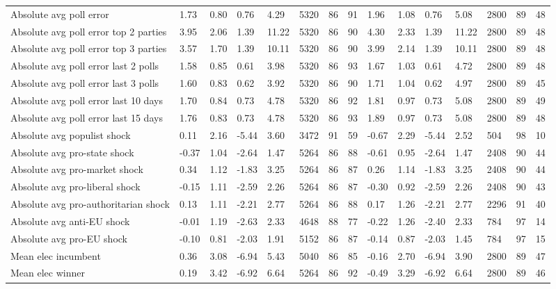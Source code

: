 \begin{longtable}{lllllllllllllll}
Absolute avg poll error & 1.73 & 0.80 & 0.76 & 4.29 & 5320 & 86 & 91 & 1.96 & 1.08 & 0.76 & 5.08 & 2800 & 89 & 48\\
Absolute avg poll error top 2 parties & 3.95 & 2.06 & 1.39 & 11.22 & 5320 & 86 & 90 & 4.30 & 2.33 & 1.39 & 11.22 & 2800 & 89 & 48\\
Absolute avg poll error top 3 parties & 3.57 & 1.70 & 1.39 & 10.11 & 5320 & 86 & 90 & 3.99 & 2.14 & 1.39 & 10.11 & 2800 & 89 & 48\\
\addlinespace
Absolute avg poll error last 2 polls & 1.58 & 0.85 & 0.61 & 3.98 & 5320 & 86 & 93 & 1.67 & 1.03 & 0.61 & 4.72 & 2800 & 89 & 48\\
Absolute avg poll error last 3 polls & 1.60 & 0.83 & 0.62 & 3.92 & 5320 & 86 & 90 & 1.71 & 1.04 & 0.62 & 4.97 & 2800 & 89 & 45\\
Absolute avg poll error last 10 days & 1.70 & 0.84 & 0.73 & 4.78 & 5320 & 86 & 92 & 1.81 & 0.97 & 0.73 & 5.08 & 2800 & 89 & 49\\
Absolute avg poll error last 15 days & 1.76 & 0.83 & 0.73 & 4.78 & 5320 & 86 & 93 & 1.89 & 0.97 & 0.73 & 5.08 & 2800 & 89 & 48\\
Absolute avg populist shock & 0.11 & 2.16 & -5.44 & 3.60 & 3472 & 91 & 59 & -0.67 & 2.29 & -5.44 & 2.52 & 504 & 98 & 10\\
\addlinespace
Absolute avg pro-state shock & -0.37 & 1.04 & -2.64 & 1.47 & 5264 & 86 & 88 & -0.61 & 0.95 & -2.64 & 1.47 & 2408 & 90 & 44\\
Absolute avg pro-market shock & 0.34 & 1.12 & -1.83 & 3.25 & 5264 & 86 & 87 & 0.26 & 1.14 & -1.83 & 3.25 & 2408 & 90 & 44\\
Absolute avg pro-liberal shock & -0.15 & 1.11 & -2.59 & 2.26 & 5264 & 86 & 87 & -0.30 & 0.92 & -2.59 & 2.26 & 2408 & 90 & 43\\
Absolute avg pro-authoritarian shock & 0.13 & 1.11 & -2.21 & 2.77 & 5264 & 86 & 88 & 0.17 & 1.26 & -2.21 & 2.77 & 2296 & 91 & 40\\
Absolute avg anti-EU shock & -0.01 & 1.19 & -2.63 & 2.33 & 4648 & 88 & 77 & -0.22 & 1.26 & -2.40 & 2.33 & 784 & 97 & 14\\
\addlinespace
Absolute avg pro-EU shock & -0.10 & 0.81 & -2.03 & 1.91 & 5152 & 86 & 87 & -0.14 & 0.87 & -2.03 & 1.45 & 784 & 97 & 15\\
Mean elec incumbent & 0.36 & 3.08 & -6.94 & 5.43 & 5040 & 86 & 85 & -0.16 & 2.70 & -6.94 & 3.90 & 2800 & 89 & 47\\
Mean elec winner & 0.19 & 3.42 & -6.92 & 6.64 & 5264 & 86 & 92 & -0.49 & 3.29 & -6.92 & 6.64 & 2800 & 89 & 46\\

\end{longtable}
